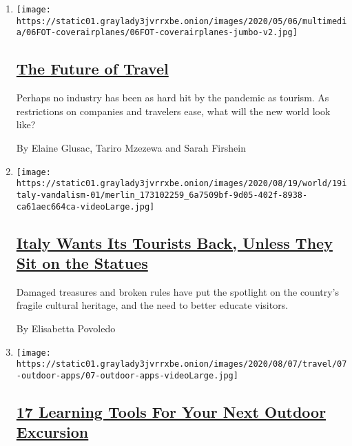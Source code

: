 \begin{enumerate}
\def\labelenumi{\arabic{enumi}.}
\item
  \texttt{[image: https://static01.graylady3jvrrxbe.onion/images/2020/05/06/multimedia/06FOT-coverairplanes/06FOT-coverairplanes-jumbo-v2.jpg]}

  \hypertarget{the-future-of-travel}{%
  \subsection{\texorpdfstring{\href{/interactive/2020/05/06/travel/coronavirus-travel-questions.html}{The
  Future of Travel}}{The Future of Travel}}\label{the-future-of-travel}}

  Perhaps no industry has been as hard hit by the pandemic as tourism.
  As restrictions on companies and travelers ease, what will the new
  world look like?

  By Elaine Glusac, Tariro Mzezewa and Sarah Firshein
\item
  \texttt{[image: https://static01.graylady3jvrrxbe.onion/images/2020/08/19/world/19italy-vandalism-01/merlin\_173102259\_6a7509bf-9d05-402f-8938-ca61aec664ca-videoLarge.jpg]}

  \hypertarget{italy-wants-its-tourists-back-unless-they-sit-on-the-statues}{%
  \subsection{\texorpdfstring{\href{/2020/08/19/world/europe/italy-vandalism-tourism.html}{Italy
  Wants Its Tourists Back, Unless They Sit on the
  Statues}}{Italy Wants Its Tourists Back, Unless They Sit on the Statues}}\label{italy-wants-its-tourists-back-unless-they-sit-on-the-statues}}

  Damaged treasures and broken rules have put the spotlight on the
  country's fragile cultural heritage, and the need to better educate
  visitors.

  By Elisabetta Povoledo
\item
  \texttt{[image: https://static01.graylady3jvrrxbe.onion/images/2020/08/07/travel/07-outdoor-apps/07-outdoor-apps-videoLarge.jpg]}

  \hypertarget{17-learning-tools-for-your-next-outdoor-excursion}{%
  \subsection{\texorpdfstring{\href{/2020/08/11/travel/outdoors-apps-podcasts.html}{17
  Learning Tools For Your Next Outdoor
  Excursion}}{17 Learning Tools For Your Next Outdoor Excursion}}\label{17-learning-tools-for-your-next-outdoor-excursion}}


\end{enumerate}
